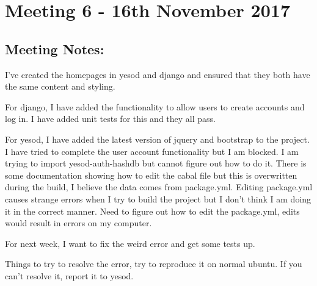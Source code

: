 \section{Meeting 6 - 16th November 2017}

\subsection{Meeting Notes:}

I’ve created the homepages in yesod and django and ensured that they both have the same content and styling.

For django, I have added the functionality to allow users to create accounts and log in. I have added unit tests for this and they all pass.

For yesod, I have added the latest version of jquery and bootstrap to the project. I have tried to complete the user account functionality but I am blocked. I am trying to import yesod-auth-hashdb but cannot figure out how to do it. There is some documentation showing how to edit the cabal file but this is overwritten during the build, I believe the data comes from package.yml. Editing package.yml causes strange errors when I try to build the project but I don’t think I am doing it in the correct manner. Need to figure out how to edit the package.yml, edits would result in errors on my computer.

For next week, I want to fix the weird error and get some tests up.

Things to try to resolve the error, try to reproduce it on normal ubuntu. If you can’t resolve it, report it to yesod.
